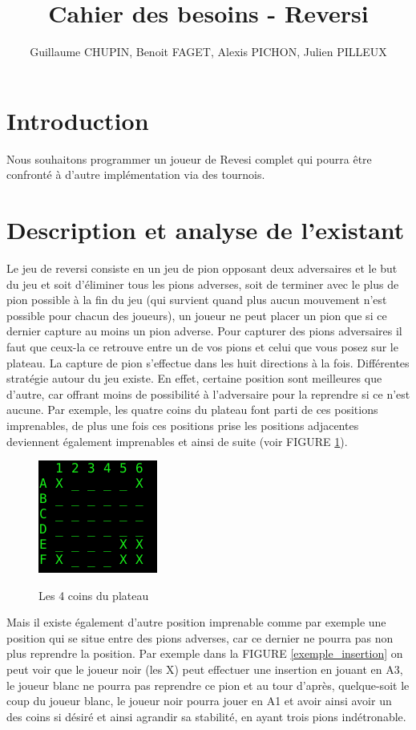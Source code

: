 \documentclass[10pt, a4paper]{article}
\title {Cahier des besoins - Reversi}
\author {Guillaume CHUPIN, Benoit FAGET, Alexis PICHON, Julien PILLEUX}
\begin{document}
\maketitle
\thispagestyle {empty}
\newpage
\tableofcontents
\newpage

\section {Introduction}
Nous souhaitons programmer un joueur de Revesi complet qui pourra être confronté à d'autre implémentation via des tournois.

\section {Description et analyse de l'existant}
Le jeu de reversi consiste en un jeu de pion opposant deux adversaires et le but du jeu et soit d'éliminer tous les pions adverses, soit de terminer avec le plus de pion possible à la fin du jeu (qui survient quand plus aucun mouvement n'est possible pour chacun des joueurs), un joueur ne peut placer un pion que si ce dernier capture au moins un pion adverse. Pour capturer des pions adversaires il faut que ceux-la ce retrouve entre un de vos pions et celui que vous posez sur le plateau. La capture de pion s'effectue dans les huit directions à la fois.\newline
Différentes stratégie autour du jeu existe. En effet, certaine position sont meilleures que d'autre, car offrant moins de possibilité à l'adversaire pour la reprendre si ce n'est aucune. Par exemple, les quatre coins du plateau font parti de ces positions imprenables, de plus une fois ces positions prise les positions adjacentes deviennent également imprenables et ainsi de suite (voir FIGURE \ref{bord_stable}).
\begin {figure}[H]
  \centering
  \includegraphics [scale = 0.5]{images/bord_stable.png}
  \label {bord_stable}
  \caption {Les 4 coins du plateau}
\end {figure}
Mais il existe également d'autre position imprenable comme par exemple une position qui se situe entre des pions adverses, car ce dernier ne pourra pas non plus reprendre la position. Par exemple dans la FIGURE \ref{exemple_insertion} on peut voir que le joueur noir (les X) peut effectuer une insertion en jouant en A3, le joueur blanc ne pourra pas reprendre ce pion et au tour d'après, quelque-soit le coup du joueur blanc, le joueur noir pourra jouer en A1 et avoir ainsi avoir un des coins si désiré et ainsi agrandir sa stabilité, en ayant trois pions indétronable.
\end{document}
